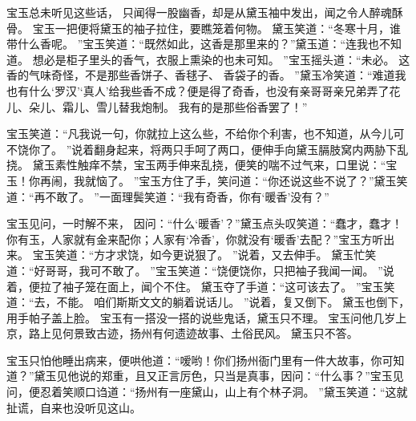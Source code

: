 宝玉总未听见这些话，
只闻得一股幽香，却是从黛玉袖中发出，闻之令人醉魂酥骨。
宝玉一把便将黛玉的袖子拉住，要瞧笼着何物。
黛玉笑道：“冬寒十月，谁带什么香呢。
”宝玉笑道：“既然如此，这香是那里来的？”黛玉道：“连我也不知道。
想必是柜子里头的香气，衣服上熏染的也未可知。
”宝玉摇头道：“未必。
这香的气味奇怪，不是那些香饼子、香毬子、
香袋子的香。
”黛玉冷笑道：“难道我也有什么‘罗汉’‘真人’给我些香不成？便是得了奇香，也没有亲哥哥亲兄弟弄了花儿、朵儿、霜儿、雪儿替我炮制。
我有的是那些俗香罢了！”\par
宝玉笑道：“凡我说一句，你就拉上这么些，不给你个利害，也不知道，从今儿可不饶你了。
”说着翻身起来，将两只手呵了两口，便伸手向黛玉膈肢窝内两胁下乱挠。
黛玉素性触痒不禁，宝玉两手伸来乱挠，便笑的喘不过气来，口里说：“宝玉！你再闹，我就恼了。
”宝玉方住了手，笑问道：“你还说这些不说了？”黛玉笑道：“再不敢了。
”一面理鬓笑道：“我有奇香，你有‘暖香’没有？”\par
宝玉见问，一时解不来，
因问：“什么‘暖香’？”黛玉点头叹笑道：“蠢才，蠢才！你有玉，人家就有金来配你；人家有‘冷香’，你就没有‘暖香’去配？”宝玉方听出来。
宝玉笑道：“方才求饶，如今更说狠了。
”说着，又去伸手。
黛玉忙笑道：“好哥哥，我可不敢了。
”宝玉笑道：“饶便饶你，只把袖子我闻一闻。
”说着，便拉了袖子笼在面上，闻个不住。
黛玉夺了手道：“这可该去了。
”宝玉笑道：“去，不能。
咱们斯斯文文的躺着说话儿。
”说着，复又倒下。
黛玉也倒下，用手帕子盖上脸。
宝玉有一搭没一搭的说些鬼话，黛玉只不理。
宝玉问他几岁上京，路上见何景致古迹，扬州有何遗迹故事、土俗民风。
黛玉只不答。
\par
宝玉只怕他睡出病来，便哄他道：“嗳哟！你们扬州衙门里有一件大故事，你可知道？”黛玉见他说的郑重，且又正言厉色，只当是真事，因问：“什么事？”宝玉见问，便忍着笑顺口诌道：“扬州有一座黛山，山上有个林子洞。
”黛玉笑道：“这就扯谎，自来也没听见这山。
